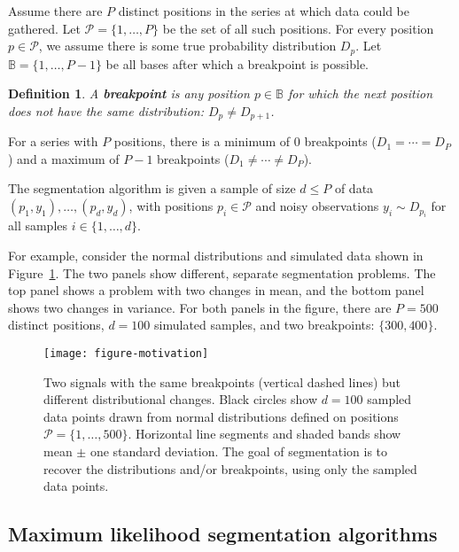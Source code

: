 \documentclass{jsfds} %
\newtheorem{definition}{Definition}
\begin{document}
Assume there are $P$ distinct positions in the series at
which data could be gathered. Let $\mathcal P= \{1,\dots,P\}$ be the
set of all such positions. For every position $p\in\mathcal P$, we
assume there is some true probability distribution $D_p$. Let $\mathbb
B=\{1,\dots,P-1\}$ be all bases after which a breakpoint is possible.

\begin{definition}
  A \textbf{breakpoint} is any position $p\in\mathbb B$ for which the
  next position does not have the same distribution: $D_p \neq
  D_{p+1}$. 
\end{definition}

For a series with $P$ positions, there is a minimum of 0 breakpoints
($D_1=\cdots=D_P$) and a maximum of $P-1$ breakpoints ($D_1 \neq
\cdots \neq D_P$).

The segmentation algorithm is given a sample of size $d \leq P$ of
data $(p_1, y_1), \dots, (p_d, y_d)$, with positions $p_i\in\mathcal
P$ and noisy observations $y_i\sim D_{p_i}$ for all samples $i\in\{1,
\dots, d\}$.

\newpage

For example, consider the normal distributions and simulated data
shown in Figure~\ref{fig:motivation}. The two panels show different,
separate segmentation problems. The top panel shows a problem with two
changes in mean, and the bottom panel shows two changes in
variance. For both panels in the figure, there are $P=500$ distinct
positions, $d=100$ simulated samples, and two breakpoints:
$\{300, 400\}$.

\begin{figure}[h!]
  \centering
  \texttt{[image: figure-motivation]}
  \vskip -0.5cm
  \caption{Two signals with the same breakpoints (vertical dashed
    lines) but different distributional changes. Black circles show
    $d=100$ sampled data points drawn from normal distributions
    defined on positions $\mathcal P=\{1, \dots, 500\}$. Horizontal line
    segments and shaded bands show mean $\pm$ one standard
    deviation. The goal of segmentation is to recover the
    distributions and/or breakpoints, using only the sampled data
    points.}
  \label{fig:motivation}
\end{figure}

\subsection{Maximum likelihood segmentation algorithms}
\label{sec:max-lik}
\end{document}
